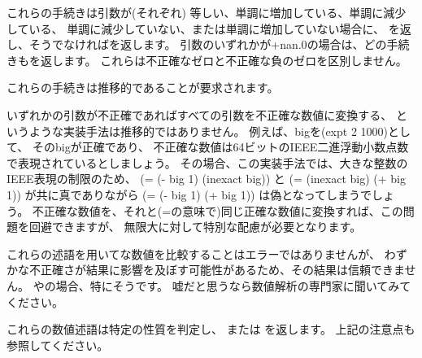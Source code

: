 \begin{entry}{%
}

これらの手続きは引数が(それぞれ)
等しい、単調に増加している、単調に減少している、
単調に減少していない、または単調に増加していない場合に、
\schtrue{}を返し、そうでなければ\schfalse{}を返します。
引数のいずれかが{\cf +nan.0}の場合は、どの手続きも\schfalse{}を返します。
これらは不正確なゼロと不正確な負のゼロを区別しません。

これらの手続きは推移的であることが要求されます。

\begin{note}
いずれかの引数が不正確であればすべての引数を不正確な数値に変換する、
というような実装手法は推移的ではありません。
例えば、{\cf big}を{\cf (expt 2 1000)}として、
その{\cf big}が正確であり、
不正確な数値は64ビットのIEEE二進浮動小数点数で表現されているとしましょう。
その場合、この実装手法では、大きな整数のIEEE表現の制限のため、
{\cf (= (- big 1) (inexact big))} と {\cf (= (inexact big) (+ big 1))} が共に真でありながら
{\cf (= (- big 1) (+ big 1))} は偽となってしまうでしょう。
不正確な数値を、それと({\cf =}の意味で)同じ正確な数値に変換すれば、この問題を回避できますが、
無限大に対して特別な配慮が必要となります。
\end{note}

\begin{note}
これらの述語を用いてな数値を比較することはエラーではありませんが、
わずかな不正確さが結果に影響を及ぼす可能性があるため、その結果は信頼できません。
\ide{=}やの場合、特にそうです。
嘘だと思うなら数値解析の専門家に聞いてみてください。

\end{note}

\end{entry}

\begin{entry}{%
}

これらの数値述語は特定の性質を判定し、\schtrue{} または \schfalse を返します。
上記の注意点も参照してください。

\end{entry}

